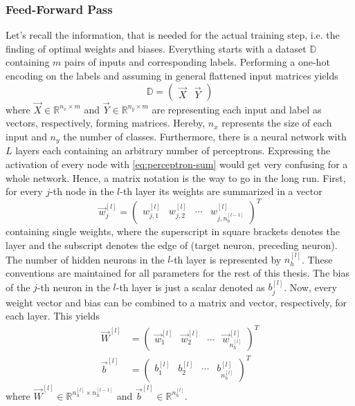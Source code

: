 \subsubsection{Feed-Forward Pass}
\label{sec:training-forward-pass}
Let's recall the information, that is needed for the actual training step, i.e. the finding of optimal weights and biases.
Everything starts with a dataset $\mathbb{D}$ containing $m$ pairs of inputs and corresponding labels.
Performing a one-hot encoding on the labels and assuming in general flattened input matrices yields
\begin{equation}
	\label{eq:dataset-one-hot}
	\mathbb{D} =
	\begin{pmatrix}
		\vec{X} & \vec{Y}
	\end{pmatrix}
\end{equation}
where $\vec{X} \in \mathbb{R}^{n_x \times m}$ and $\vec{Y} \in \mathbb{R}^{n_y \times m}$ are representing each input and label as vectors, respectively, forming matrices.
Hereby, $n_x$ represents the size of each input and $n_y$ the number of classes.
Furthermore, there is a neural network with $L$ layers each containing an arbitrary number of perceptrons.
Expressing the activation of every node with \eqref{eq:perceptron-sum} would get very confusing for a whole network.
Hence, a matrix notation is the way to go in the long run.
First, for every $j$-th node in the $l$-th layer its weights are summarized in a vector
\begin{equation}
	\label{eq:weights-vector}
	\vec{w}^{[l]}_j =
	\begin{pmatrix}
		w^{[l]}_{j,1} & w^{[l]}_{j,2} & \cdots & w^{[l]}_{j,n^{[l-1]}_h}
	\end{pmatrix}^T
\end{equation}
containing single weights, where the superscript in square brackets denotes the layer and the subscript denotes the edge of (target neuron, preceding neuron).
The number of hidden neurons in the $l$-th layer is represented by $n^{[l]}_h$.
These conventions are maintained for all parameters for the rest of this thesis.
The bias of the $j$-th neuron in the $l$-th layer is just a scalar denoted as $b^{[l]}_j$. 
Now, every weight vector and bias can be combined to a matrix and vector, respectively, for each layer.
This yields
\begin{subequations}
\label{eq:parameters}
	\begin{align}
		\vec{W}^{[l]} &=
		\begin{pmatrix}
			\vec{w}^{[l]}_1 & \vec{w}^{[l]}_2 & \cdots & \vec{w}^{[l]}_{n^{[l]}_h}
		\end{pmatrix}^T
		\label{eq:weights}
		\\
		\vec{b}^{[l]} &=
			\begin{pmatrix}
				b^{[l]}_1 & b^{[l]}_2 & \cdots & b^{[l]}_{n^{[l]}_h}
			\end{pmatrix}^T
		\label{eq:biases}
	\end{align}
\end{subequations}
where $\vec{W}^{[l]} \in \mathbb{R}^{n^{[l]}_h \times n^{[l-1]}_h}$ and $\vec{b}^{[l]} \in \mathbb{R}^{n^{[l]}_h}$.

